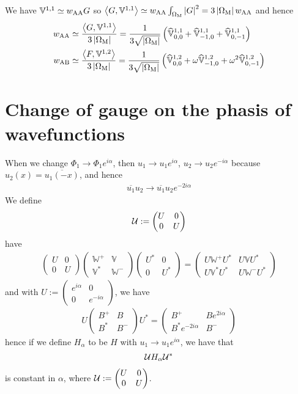 \documentclass[11pt,a4paper,reqno,french,tikz]{amsart}
\newcommand{\pa}[1]{\left( #1 \right)} %
\newcommand{\ab}[1]{\left|#1\right|} %
\newcommand{\ps}[1]{\left< #1 \right>} %
\newcommand{\f}[2]{\frac{#1}{#2}} %
\newcommand{\ind}[1]{_{\textup{#1}}} %
\newcommand{\mat}[1]{\begin{pmatrix} #1 \end{pmatrix}} %
\newcommand{\bbV}{\mathbb{V}}
\def\bbV{{\mathbb V}}
\def\bbW{{\mathbb W}}
\newcommand{\sqom}{\sqrt{\ab{\Omega\ind{M}}}}
\begin{document}
We have $\bbV^{1,1} \simeq w\ind{AA} G$ so $\ps{G,\bbV^{1,1}} \simeq w\ind{AA} \int_{\Omega\ind{M}} \ab{G}^2 = 3 \ab{\Omega\ind{M}} w\ind{AA}$ and hence 
\begin{align*}
	w\ind{AA} &\simeq \f{\ps{G,\bbV^{1,1}}}{3 \ab{\Omega\ind{M}}} = \f{1}{3 \sqom}\pa{\widehat{\bbV}^{1,1}_{0,0} +\widehat{\bbV}^{1,1}_{-1,0} + \widehat{\bbV}^{1,1}_{0,-1}} \\
	w\ind{AB} &\simeq \f{\ps{F,\bbV^{1,2}}}{3 \ab{\Omega\ind{M}}} = \f{1}{3 \sqom}\pa{\widehat{\bbV}^{1,2}_{0,0} + \omega\widehat{\bbV}^{1,2}_{-1,0} + \omega^2 \widehat{\bbV}^{1,2}_{0,-1}}
\end{align*}





\section{Change of gauge on the phasis of wavefunctions}%
\label{sec:change_of_gauge_on_the_phasis_of_wavefunctions}

When we change $\Phi_1 \rightarrow \Phi_1 e^{i\alpha}$, then $u_1 \rightarrow u_1 e^{i\alpha}$, $u_2 \rightarrow u_2 e^{-i\alpha}$ because $u_2(x) = \overline{u_1(-x)}$, and hence
\begin{align*}
\boxed{\overline{u_1} u_2 \rightarrow \overline{u_1} u_2 e^{-2i\alpha}}
\end{align*}
We define
\begin{align*}
	\cU := \mat{U & 0 \\ 0 & U}
\end{align*}
have
\begin{align*}
	\mat{U & 0 \\ 0 & U} \mat{\bbW^+ & \bbV \\ \bbV^* & \bbW^-}  \mat{U^* & 0 \\ 0 & U^*} = \mat{U\bbW^+ U^* & U\bbV U^*\\ U\bbV^*U^* & U\bbW^-U^*}
\end{align*}
and with $U := \mat{e^{i\alpha} & 0 \\  0 & e^{-i\alpha}}$, we have
\begin{align*}
	U \mat{B^+ & B \\ B^* & B^-} U^* = \mat{B^+ & B e^{2i\alpha} \\ B^* e^{-2i\alpha} & B^-}
\end{align*}
hence if we define $H_\alpha$ to be $H$ with $u_1 \rightarrow u_1 e^{i\alpha}$, we have that
\begin{align*}
\mathcal{U} H_\alpha \mathcal{U}^*
\end{align*}
is constant in $\alpha$, where $\cU := \mat{U & 0 \\ 0 & U}$.
\end{document}

